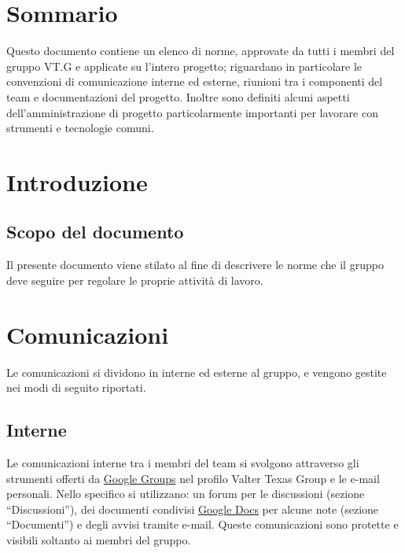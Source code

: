 \tableofcontents


\chapter*{Sommario}
\thispagestyle{fancy}
Questo documento contiene un elenco di norme, approvate da
tutti i membri del gruppo VT.G e applicate su l'intero progetto; riguardano in
particolare le convenzioni di comunicazione interne ed esterne, riunioni tra i componenti del team e
documentazioni del progetto. Inoltre sono definiti alcuni aspetti
dell'amministrazione di progetto particolarmente importanti per lavorare con strumenti e tecnologie
comuni.

\thispagestyle{fancy} %


\chapter{Introduzione}
\thispagestyle{fancy} %

\section{Scopo del documento}
Il presente documento viene stilato al fine di descrivere le norme che il gruppo
deve seguire per regolare le proprie attivit\`a di lavoro.



\chapter{Comunicazioni}
\thispagestyle{fancy}
Le comunicazioni si dividono in interne ed esterne al gruppo, e vengono gestite
nei modi di seguito riportati.

\section{Interne}
Le comunicazioni interne tra i membri del team si svolgono attraverso gli
strumenti offerti da \underline{Google Groups} nel profilo Valter Texas Group e
le e-mail personali. Nello specifico si utilizzano: un forum per le discussioni
(sezione ``Discussioni''), dei documenti condivisi \underline{Google Docs} per
alcune note (sezione ``Documenti'') e degli avvisi tramite e-mail. 
Queste comunicazioni sono protette e visibili soltanto ai membri del gruppo.


